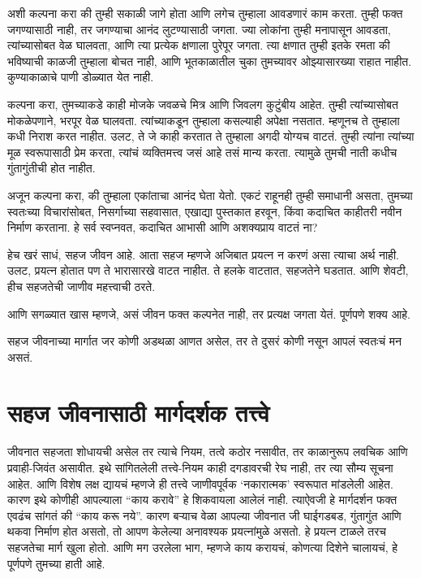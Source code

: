 अशी कल्पना करा की तुम्ही सकाळी जागे होता आणि लगेच तुम्हाला आवडणारं काम करता. तुम्ही फक्त जगण्यासाठी नाही, तर जगण्याचा आनंद लुटण्यासाठी जगता. ज्या लोकांना तुम्ही मनापासून आवडता, त्यांच्यासोबत वेळ घालवता, आणि त्या प्रत्येक क्षणाला पुरेपूर जगता. त्या क्षणात तुम्ही इतके रमता की भविष्याची काळजी तुम्हाला बोचत नाही, आणि भूतकाळातील चुका तुमच्यावर ओझ्यासारख्या राहात नाहीत. कुण्याकाळाचे पाणी डोळ्यात येत नाही. 

कल्पना करा, तुमच्याकडे काही मोजके जवळचे मित्र आणि जिवलग कुटुंबीय आहेत. तुम्ही त्यांच्यासोबत मोकळेपणाने, भरपूर वेळ घालवता. त्यांच्याकडून तुम्हाला कसल्याही अपेक्षा नसतात. म्हणूनच ते तुम्हाला कधी निराश करत नाहीत. उलट, ते जे काही करतात ते तुम्हाला अगदी योग्यच वाटतं. तुम्ही त्यांना त्यांच्या मूळ स्वरूपासाठी प्रेम करता, त्यांचं व्यक्तिमत्त्व जसं आहे तसं मान्य करता. त्यामुळे तुमची नाती कधीच गुंतागुंतीची होत नाहीत.

अजून कल्पना करा, की तुम्हाला एकांताचा आनंद घेता येतो. एकटं राहूनही तुम्ही समाधानी असता, तुमच्या स्वतःच्या विचारांसोबत, निसर्गाच्या सहवासात, एखाद्या पुस्तकात हरवून, किंवा कदाचित काहीतरी नवीन निर्माण करताना. हे सर्व स्वप्नवत, कदाचित आभासी आणि अशक्यप्राय वाटतं  ना? 

हेच खरं साधं, सहज जीवन आहे. आता सहज म्हणजे अजिबात प्रयत्न न करणं असा त्याचा अर्थ नाही. उलट, प्रयत्न होतात पण ते भारासारखे वाटत नाहीत. ते हलके वाटतात, सहजतेने घडतात. आणि शेवटी, हीच सहजतेची जाणीव महत्त्वाची ठरते.

आणि सगळ्यात खास म्हणजे, असं जीवन फक्त कल्पनेत नाही, तर प्रत्यक्ष जगता येतं. पूर्णपणे शक्य आहे.

सहज जीवनाच्या मार्गात जर कोणी अडथळा आणत असेल, तर ते दुसरं कोणी नसून आपलं स्वतःचं मन असतं.

\chapter{सहज जीवनासाठी मार्गदर्शक तत्त्वे}

जीवनात सहजता शोधायची असेल तर त्याचे नियम, तत्वे  कठोर नसावीत, तर काळानुरूप लवचिक आणि प्रवाही-जिवंत असावीत. इथे सांगितलेली तत्त्वे-नियम काही दगडावरची रेघ नाही, तर त्या सौम्य सूचना आहेत. आणि विशेष लक्ष द्यायचं म्हणजे ही तत्त्वे जाणीवपूर्वक ‘नकारात्मक’ स्वरूपात मांडलेली आहेत. कारण इथे कोणीही आपल्याला “काय करावे” हे शिकवायला आलेलं नाही. त्याऐवजी हे मार्गदर्शन फक्त एवढंच सांगतं की “काय करू नये”. कारण बऱ्याच वेळा आपल्या जीवनात जी घाईगडबड, गुंतागुंत आणि थकवा निर्माण होत असतो, तो आपण केलेल्या अनावश्यक प्रयत्नांमुळे असतो. हे प्रयत्न टाळले तरच सहजतेचा मार्ग खुला होतो. आणि मग उरलेला भाग, म्हणजे काय करायचं, कोणत्या दिशेने चालायचं, हे पूर्णपणे तुमच्या हाती आहे.


